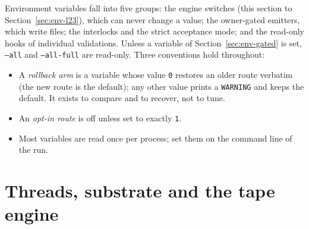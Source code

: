 \documentclass[11pt,openany]{report}
\newcommand{\cli}[1]{\texttt{#1}}
\begin{document}
Environment variables fall into five groups: the engine switches (this section to Section~\ref{sec:env-l23}), which can
never change a value; the owner-gated emitters, which write files; the interlocks and the strict acceptance mode; and the
read-only hooks of individual validations. Unless a variable of Section~\ref{sec:env-gated} is set, \cli{--all} and
\cli{--all-full} are read-only. Three conventions hold throughout:
\begin{itemize}[nosep]
\item A \emph{rollback arm} is a variable whose value \texttt{0} restores an older route verbatim (the new route is the
  default); any other value prints a \texttt{WARNING} and keeps the default. It exists to compare and to recover, not to
  tune.
\item An \emph{opt-in route} is off unless set to exactly \texttt{1}.
\item Most variables are read once per process; set them on the command line of the run.
\end{itemize}

\section{Threads, substrate and the tape engine}\label{sec:env-engine}
\end{document}
